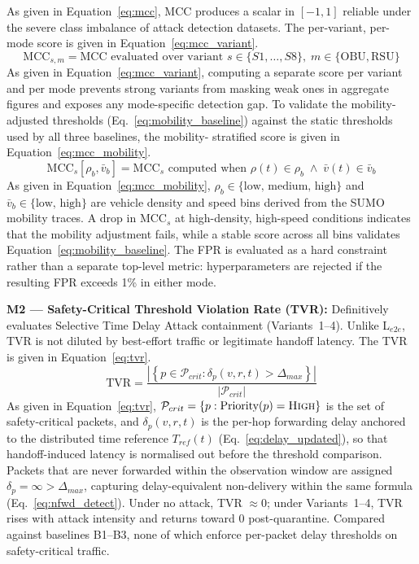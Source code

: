 \documentclass[12pt, a4paper]{report}
\begin{document}
{{As given in Equation~\eqref{eq:mcc}, MCC produces a
scalar in $[-1,1]$ reliable under the severe class
imbalance of attack detection datasets.
The per-variant, per-mode score is given in
Equation~\eqref{eq:mcc_variant}.
\begin{equation}
\text{MCC}_{s,m} = \text{MCC evaluated over variant }
s \in \{S1,\ldots,S8\},\;
m \in \{\text{OBU},\text{RSU}\}
\label{eq:mcc_variant}
\end{equation}
As given in Equation~\eqref{eq:mcc_variant}, computing
a separate score per variant and per mode prevents
strong variants from masking weak ones in aggregate
figures and exposes any mode-specific detection gap.
To validate the mobility-adjusted thresholds
(Eq.~\ref{eq:mobility_baseline}) against the static
thresholds used by all three baselines, the mobility-
stratified score is given in
Equation~\eqref{eq:mcc_mobility}.
\begin{equation}
\text{MCC}_{s}[\rho_b, \bar{v}_b] =
\text{MCC}_{s}\text{ computed when }
\rho(t) \in \rho_b \;\land\;
\bar{v}(t) \in \bar{v}_b
\label{eq:mcc_mobility}
\end{equation}
As given in Equation~\eqref{eq:mcc_mobility},
$\rho_b \in \{\text{low, medium, high}\}$ and
$\bar{v}_b \in \{\text{low, high}\}$ are vehicle
density and speed bins derived from the SUMO mobility
traces. A drop in $\text{MCC}_{s}$ at high-density,
high-speed conditions indicates that the mobility
adjustment fails, while a stable score across all bins
validates Equation~\eqref{eq:mobility_baseline}.
The \ac{FPR} is evaluated as a hard constraint rather
than a separate top-level metric: hyperparameters are
rejected if the resulting FPR exceeds 1\% in either mode.



\textbf{M2 — Safety-Critical Threshold Violation Rate (TVR):}
Definitively evaluates Selective Time Delay Attack
containment (Variants~1--4). Unlike L$_{e2e}$, TVR
is not diluted by best-effort traffic or legitimate
handoff latency. The TVR is given in
Equation~\eqref{eq:tvr}.
\begin{equation}
\text{TVR} =
\frac{\left|\left\{
p \in \mathcal{P}_{crit} :
\delta_p(v,r,t) > \Delta_{max}
\right\}\right|}{|\mathcal{P}_{crit}|}
\label{eq:tvr}
\end{equation}
As given in Equation~\eqref{eq:tvr},
$\mathcal{P}_{crit} = \{p :
\text{Priority}(p) = \textsc{High}\}$ is the set
of safety-critical packets, and $\delta_p(v,r,t)$
is the per-hop forwarding delay anchored to the
distributed time reference $T_{ref}(t)$
(Eq.~\ref{eq:delay_updated}), so that handoff-induced
latency is normalised out before the threshold
comparison. Packets that are never forwarded within
the observation window are assigned $\delta_p =
\infty > \Delta_{max}$, capturing delay-equivalent
non-delivery within the same formula
(Eq.~\ref{eq:nfwd_detect}). Under no attack,
TVR $\approx 0$; under Variants~1--4, TVR rises with
attack intensity and returns toward 0 post-quarantine.
Compared against baselines B1--B3, none of which
enforce per-packet delay thresholds on safety-critical
traffic.


}}
\end{document}
